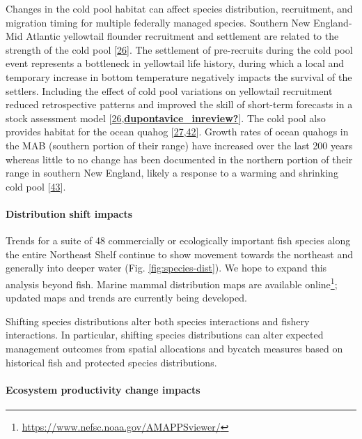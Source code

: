 \documentclass[
  10pt,
]{article}
\begin{document}
Changes in the cold pool habitat can affect species distribution,
recruitment, and migration timing for multiple federally managed
species. Southern New England-Mid Atlantic yellowtail flounder
recruitment and settlement are related to the strength of the cold pool
{[}\protect\hyperlink{ref-miller_state-space_2016}{26}{]}. The
settlement of pre-recruits during the cold pool event represents a
bottleneck in yellowtail life history, during which a local and
temporary increase in bottom temperature negatively impacts the survival
of the settlers. Including the effect of cold pool variations on
yellowtail recruitment reduced retrospective patterns and improved the
skill of short-term forecasts in a stock assessment model
{[}\protect\hyperlink{ref-miller_state-space_2016}{26},\protect\hyperlink{ref-dupontavice_inreview}{\textbf{dupontavice\_inreview?}}{]}.
The cold pool also provides habitat for the ocean quahog
{[}\protect\hyperlink{ref-friedland_middle_2022}{27},\protect\hyperlink{ref-powell_ocean_2020}{42}{]}.
Growth rates of ocean quahogs in the MAB (southern portion of their
range) have increased over the last 200 years whereas little to no
change has been documented in the northern portion of their range in
southern New England, likely a response to a warming and shrinking cold
pool {[}\protect\hyperlink{ref-pace_two-hundred_2018}{43}{]}.

\hypertarget{distribution-shift-impacts}{%
\paragraph{Distribution shift
impacts}\label{distribution-shift-impacts}}

Trends for a suite of 48 commercially or ecologically important fish
species along the entire Northeast Shelf continue to show movement
towards the northeast and generally into deeper water (Fig.
\ref{fig:species-dist}). We hope to expand this analysis beyond fish.
Marine mammal distribution maps are available online\footnote{\url{https://www.nefsc.noaa.gov/AMAPPSviewer/}};
updated maps and trends are currently being developed.

Shifting species distributions alter both species interactions and
fishery interactions. In particular, shifting species distributions can
alter expected management outcomes from spatial allocations and bycatch
measures based on historical fish and protected species distributions.

\hypertarget{ecosystem-productivity-change-impacts}{%
\paragraph{Ecosystem productivity change
impacts}\label{ecosystem-productivity-change-impacts}}
\end{document}
